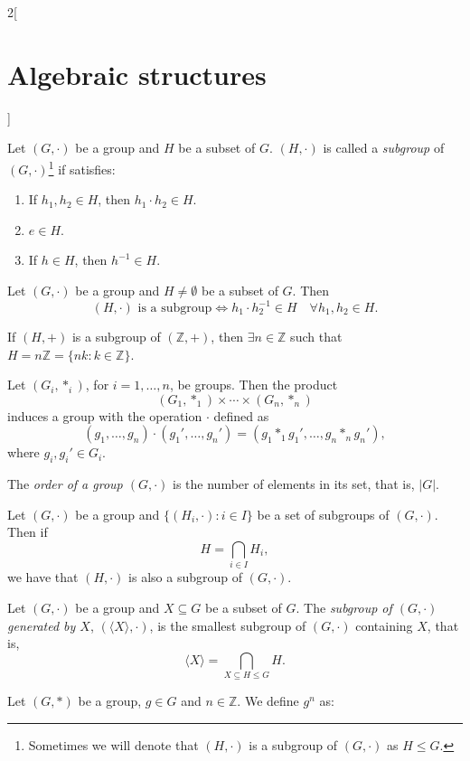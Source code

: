 \documentclass[../../../main.tex]{subfiles}
\begin{document}
\begin{multicols}{2}[\section{Algebraic structures}]
\begin{definition}[Subgroup]
    Let $(G,\cdot)$ be a group and $H$ be a subset of $G$. $(H,\cdot)$ is called a \textit{subgroup} of $(G,\cdot)$\footnote{Sometimes we will denote that $(H,\cdot)$ is a subgroup of $(G,\cdot)$ as $H\leq G$.} if satisfies:
    \begin{enumerate}
        \item If $h_1,h_2\in H$, then $h_1\cdot h_2\in H$.
        \item $e\in H$.
        \item If $h\in H$, then $h^{-1}\in H$.
    \end{enumerate}
\end{definition}
\begin{prop}
    Let $(G,\cdot)$ be a group and $H\ne\emptyset$ be a subset of $G$. Then $$(H,\cdot)\text{ is a subgroup}\iff h_1\cdot h_2^{-1}\in H\quad\forall h_1,h_2\in H.$$
\end{prop}
\begin{prop}
    If $(H,+)$ is a subgroup of $(\mathbb{Z},+)$, then $\exists n\in\mathbb{Z}$ such that $H=n\mathbb{Z}=\{nk:k\in\mathbb{Z}\}$.
\end{prop}
\begin{prop}
    Let $(G_i,*_i)$, for $i=1,\ldots, n$, be groups. Then the product $$(G_1,*_1)\times\cdots\times(G_n,*_n)$$ induces a group with the operation $\cdot$ defined as $$(g_1,\ldots,g_n)\cdot(g_1',\ldots,g_n')=(g_1*_1g_1',\ldots,g_n*_ng_n'),$$ where $g_i,g_i'\in G_i$.
\end{prop}
\begin{definition}
    The \textit{order of a group $(G,\cdot)$} is the number of elements in its set, that is, $|G|$.
\end{definition}
\begin{lemma}
    Let $(G,\cdot)$ be a group and $\{(H_i,\cdot):i\in I\}$ be a set of subgroups of $(G,\cdot)$. Then if $$H=\displaystyle\bigcap_{i\in I}H_i,$$ we have that $(H,\cdot)$ is also a subgroup of $(G,\cdot)$.
\end{lemma}
\begin{definition}
    Let $(G,\cdot)$ be a group and $X\subseteq G$ be a subset of $G$. The \textit{subgroup of $(G,\cdot)$ generated by $X$}, $(\langle X\rangle,\cdot)$, is the smallest subgroup of $(G,\cdot)$ containing $X$, that is, $$\langle X\rangle=\bigcap_{X\subseteq H\leq G}H.$$
\end{definition}
\begin{definition}
    Let $(G,*)$ be a group, $g\in G$ and $n\in\mathbb{Z}$. We define $g^n$ as: 

\end{definition}
\end{multicols}
\end{document}
